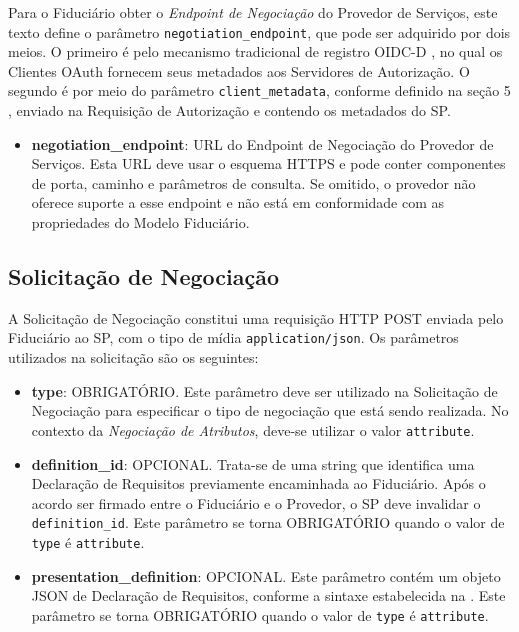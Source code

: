 Para o Fiduciário obter o \emph{Endpoint de Negociação} do Provedor de Serviços, este texto define o parâmetro \texttt{negotiation\_endpoint}, que pode ser adquirido por dois meios. O primeiro é pelo mecanismo tradicional de registro \acs{OIDC-D} \cite{sakimura2023openidDiscovery}, no qual os Clientes OAuth fornecem seus metadados aos Servidores de Autorização. O segundo é por meio do parâmetro \texttt{client\_metadata}, conforme definido na seção 5 \cite{OIDC4VP2023}, enviado na Requisição de Autorização e contendo os metadados do \acs{SP}.

\begin{itemize}
    \item \textbf{negotiation\_endpoint}: URL do Endpoint de Negociação do Provedor de Serviços. Esta URL deve usar o esquema HTTPS e pode conter componentes de porta, caminho e parâmetros de consulta. Se omitido, o provedor não oferece suporte a esse endpoint e não está em conformidade com as propriedades do Modelo Fiduciário.
\end{itemize}



\subsection{Solicitação de Negociação}\label{subsection:negotiation-request}

A Solicitação de Negociação constitui uma requisição HTTP POST enviada pelo Fiduciário ao \acs{SP}, com o tipo de mídia \texttt{application/json}. Os parâmetros utilizados na solicitação são os seguintes:



\begin{itemize}

    \item \textbf{type}: OBRIGATÓRIO. Este parâmetro deve ser utilizado na Solicitação de Negociação para especificar o tipo de negociação que está sendo realizada. No contexto da \emph{Negociação de Atributos}, deve-se utilizar o valor \texttt{attribute}.

    \item \textbf{definition\_id}: OPCIONAL. Trata-se de uma string que identifica uma Declaração de Requisitos previamente encaminhada ao Fiduciário. Após o acordo ser firmado entre o Fiduciário e o Provedor, o \acs{SP} deve invalidar o \texttt{definition\_id}. Este parâmetro se torna OBRIGATÓRIO quando o valor de \texttt{type} é \texttt{attribute}.
    
    \item \textbf{presentation\_definition}: OPCIONAL. Este parâmetro contém um objeto JSON de Declaração de Requisitos, conforme a sintaxe estabelecida na \cite{presentation-exchange}. Este parâmetro se torna OBRIGATÓRIO quando o valor de \texttt{type} é \texttt{attribute}.
    
\end{itemize}

